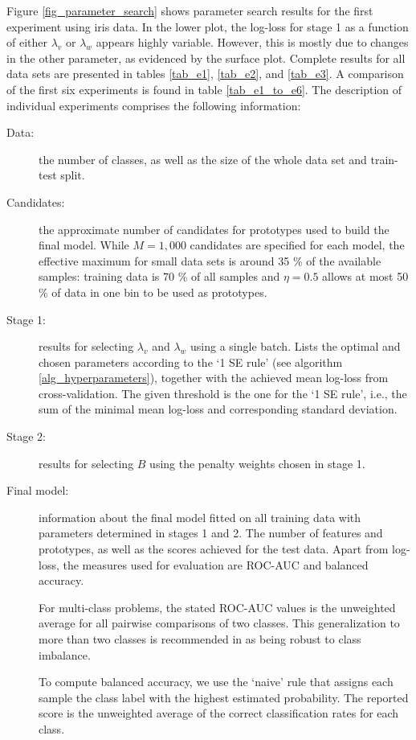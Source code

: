 %
Figure \ref{fig_parameter_search} shows parameter search results for the first experiment using iris data.
In the lower plot, the log-loss for stage 1 as a function of either $\lambda_v$ or $\lambda_w$ appears highly variable.
However, this is mostly due to changes in the other parameter, as evidenced by the surface plot.
Complete results for all data sets are presented in tables \ref{tab_e1}, \ref{tab_e2}, and \ref{tab_e3}.
A comparison of the first six experiments is found in table \ref{tab_e1_to_e6}.
The description of individual experiments comprises the following information:
%
\begin{description}
\item[Data:] the number of classes, as well as the size of the whole data set and train-test split.
%
\item[Candidates:] the approximate number of candidates for prototypes used to build the final model.
While $M=1,000$ candidates are specified for each model, the effective maximum for small data sets is around 35 \% of the available samples: training data is 70 \% of all samples and $\eta=0.5$ allows at most 50 \% of data in one bin to be used as prototypes.
%
\item[Stage 1:] results for selecting $\lambda_v$ and $\lambda_w$ using a single batch.
Lists the optimal and chosen parameters according to the `1 SE rule' (see algorithm \ref{alg_hyperparameters}), together with the achieved mean log-loss from cross-validation.
The given threshold is the one for the `1 SE rule', i.e., the sum of the minimal mean log-loss and corresponding standard deviation.
%
\item[Stage 2:] results for selecting $B$ using the penalty weights chosen in stage 1.
%
\item[Final model:] information about the final model fitted on all training data with parameters determined in stages 1 and 2.
The number of features and prototypes, as well as the scores achieved for the test data.
Apart from log-loss, the measures used for evaluation are ROC-AUC and balanced accuracy.\par
%
For multi-class problems, the stated ROC-AUC values is the unweighted average for all pairwise comparisons of two classes.
This generalization to more than two classes is recommended in \cite{Hand_01} as being robust to class imbalance.\par
%
To compute balanced accuracy, we use the `naive' rule that assigns each sample the class label with the highest estimated probability.
The reported score is the unweighted average of the correct classification rates for each class.
\end{description}
